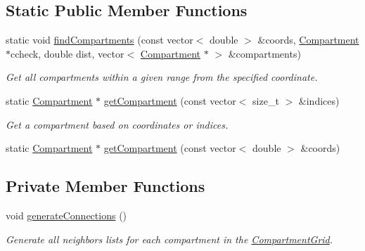 \subsection*{Static Public Member Functions}
\begin{DoxyCompactItemize}
\item 
static void \hyperlink{classGController_a3217b2c56180064a0efda25e79bd6267}{find\+Compartments} (const vector$<$ double $>$ \&coords, \hyperlink{classCompartment}{Compartment} $\ast$ccheck, double dist, vector$<$ \hyperlink{classCompartment}{Compartment} $\ast$ $>$ \&compartments)
\begin{DoxyCompactList}\small\item\em Get all compartments within a given range from the specified coordinate. \end{DoxyCompactList}\end{DoxyCompactItemize}
{\bf }\par
\begin{DoxyCompactItemize}
\item 
static \hyperlink{classCompartment}{Compartment} $\ast$ \hyperlink{classGController_aec4700bedd12cf8d83c0ffa2c3f49891}{get\+Compartment} (const vector$<$ size\+\_\+t $>$ \&indices)
\begin{DoxyCompactList}\small\item\em Get a compartment based on coordinates or indices. \end{DoxyCompactList}\item 
static \hyperlink{classCompartment}{Compartment} $\ast$ \hyperlink{classGController_af4a3bd7c2e4868529860c58e125f6447}{get\+Compartment} (const vector$<$ double $>$ \&coords)
\end{DoxyCompactItemize}

\subsection*{Private Member Functions}
\begin{DoxyCompactItemize}
\item 
void \hyperlink{classGController_a94281778427606e93a54c67ab288e2cc}{generate\+Connections} ()
\begin{DoxyCompactList}\small\item\em Generate all neighbors lists for each compartment in the \hyperlink{classCompartmentGrid}{Compartment\+Grid}. \end{DoxyCompactList}\end{DoxyCompactItemize}
